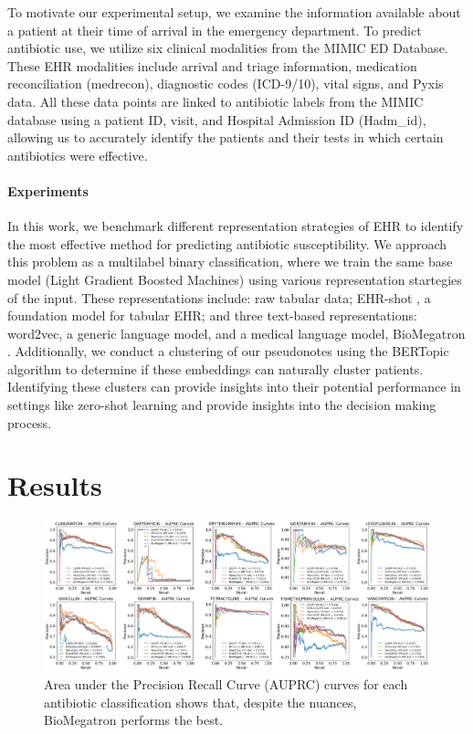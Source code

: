 \documentclass{article}
\theoremstyle{plain}
\theoremstyle{definition}
\theoremstyle{remark}
\begin{document}
To motivate our experimental setup, we examine the information available about a patient at their time of arrival in the emergency department. To predict antibiotic use, we utilize six clinical modalities from the MIMIC ED Database. These EHR modalities include arrival and triage information, medication reconciliation (medrecon), diagnostic codes (ICD-9/10), vital signs, and Pyxis data. All these data points are linked to antibiotic labels from the MIMIC database using a patient ID, visit, and Hospital Admission ID (Hadm\_id), allowing us to accurately identify the patients and their tests in which certain antibiotics were effective.

\paragraph{Experiments}
In this work, we benchmark different representation strategies of EHR to identify the most effective method for predicting antibiotic susceptibility. We approach this problem as a multilabel binary classification, where we train the same base model (Light Gradient Boosted Machines) using various representation startegies of the input. These representations include: raw tabular data; EHR-shot \cite{wornow2024ehrshot}, a foundation model for tabular EHR; and three text-based representations: word2vec, a generic language model, and a medical language model, BioMegatron \cite{shin2020biomegatron}. Additionally, we conduct a clustering of our pseudonotes using the BERTopic algorithm \cite{grootendorst2022bertopic} to determine if these embeddings can naturally cluster patients. Identifying these clusters can provide insights into their potential performance in settings like zero-shot learning and provide insights into the decision making process.

\section{Results}

\begin{figure}[h!]
\vskip 0.1in
\begin{center}
\centerline{\includegraphics[width=6.5in]{auprc.png}}
\caption{Area under the Precision Recall Curve (AUPRC) curves for each antibiotic classification shows that, despite the nuances, BioMegatron performs the best.}
\label{auprc}
\end{center}
\vskip -0.1in
\end{figure}
\end{document}
